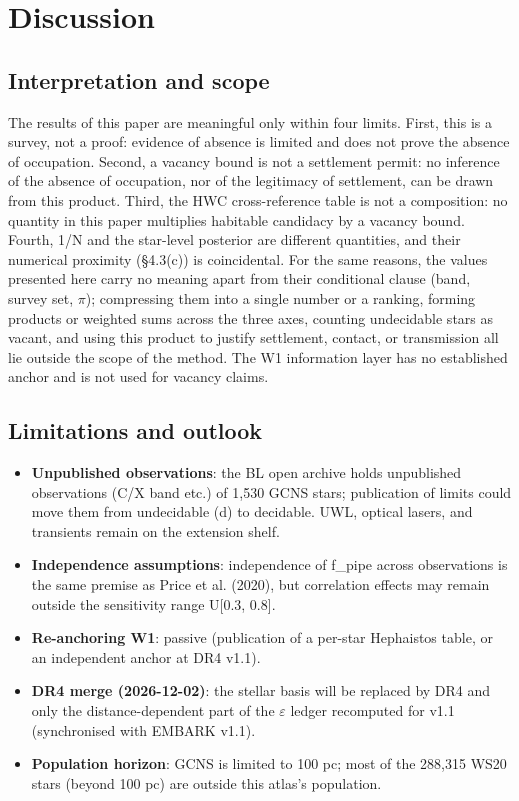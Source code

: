\documentclass{aa}
\begin{document}
\section{Discussion}

\subsection{Interpretation and scope}
\noindent The results of this paper are meaningful only within four limits. First, this is a survey, not a proof: evidence of absence is limited and does not prove the absence of occupation. Second, a vacancy bound is not a settlement permit: no inference of the absence of occupation, nor of the legitimacy of settlement, can be drawn from this product. Third, the HWC cross-reference table is not a composition: no quantity in this paper multiplies habitable candidacy by a vacancy bound. Fourth, 1/N and the star-level posterior are different quantities, and their numerical proximity (\S{}4.3(c)) is coincidental. For the same reasons, the values presented here carry no meaning apart from their conditional clause (band, survey set, \(\pi\)); compressing them into a single number or a ranking, forming products or weighted sums across the three axes, counting undecidable stars as vacant, and using this product to justify settlement, contact, or transmission all lie outside the scope of the method. The W1 information layer has no established anchor and is not used for vacancy claims.\par\smallskip

\subsection{Limitations and outlook}
\begin{itemize}\setlength{\itemsep}{1pt}
\item \textbf{Unpublished observations}: the BL open archive holds unpublished observations (C/X band etc.) of 1,530 GCNS stars; publication of limits could move them from undecidable (d) to decidable. UWL, optical lasers, and transients remain on the extension shelf.
\item \textbf{Independence assumptions}: independence of f\_pipe across observations is the same premise as Price et al. (2020), but correlation effects may remain outside the sensitivity range U[0.3, 0.8].
\item \textbf{Re-anchoring W1}: passive (publication of a per-star Hephaistos table, or an independent anchor at DR4 v1.1).
\item \textbf{DR4 merge (2026-12-02)}: the stellar basis will be replaced by DR4 and only the distance-dependent part of the \(\varepsilon\) ledger recomputed for v1.1 (synchronised with EMBARK v1.1).
\item \textbf{Population horizon}: GCNS is limited to 100 pc; most of the 288,315 WS20 stars (beyond 100 pc) are outside this atlas's population.
\end{itemize}
\end{document}

